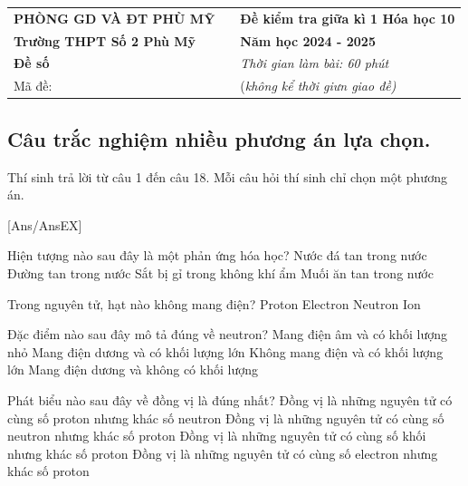 \begin{tcolorbox}[
	enhanced jigsaw,
	frame empty,
	colback=\mycolor!10,
	arc is angular,
	arc=3mm
	]
	{\renewcommand{\arraystretch}{0.9} \begin{tabular}{C{0.4\textwidth}p{0.2cm}C{0.6\textwidth}}
			{\textbf{PHÒNG GD VÀ ĐT PHÙ MỸ}} && {\textbf{Đề kiểm tra giữa kì 1 Hóa học 10}}\\
			{\textbf{Trường THPT Số 2 Phù Mỹ}} && {\textbf{Năm học 2024 - 2025}}\\
			{\textbf{Đề số \thesode}} && {\itshape Thời gian làm bài: 60 phút}\\
			Mã đề: \textbf{\made} & & (\itshape không kể thời giưn giao đề)
	\end{tabular}}
\end{tcolorbox}
\subsection{Câu trắc nghiệm nhiều phương án lựa chọn.} Thí sinh trả lời từ câu 1 đến câu 18. Mỗi câu hỏi thí sinh chỉ chọn một phương án.

[Ans/AnsEX]
\setcounter{ex}{0}
	\begin{ex}
		Hiện tượng nào sau đây là một phản ứng hóa học?
		\choice
		{Nước đá tan trong nước}
		{Đường tan trong nước}
		{Sắt bị gỉ trong không khí ẩm}
		{Muối ăn tan trong nước}
		\loigiai{}
	\end{ex}
	
	\begin{ex}
		Trong nguyên tử, hạt nào không mang điện?
		\choice
		{Proton}
		{Electron}
		{Neutron}
		{Ion}
		\loigiai{}
	\end{ex}
	
	\begin{ex}
		Đặc điểm nào sau đây mô tả đúng về neutron?
		\choice
		{Mang điện âm và có khối lượng nhỏ}
		{Mang điện dương và có khối lượng lớn}
		{Không mang điện và có khối lượng lớn}
		{Mang điện dương và không có khối lượng}
		\loigiai{}
	\end{ex}
	
	\begin{ex}
		Phát biểu nào sau đây về đồng vị là đúng nhất?
		\choice
		{Đồng vị là những nguyên tử có cùng số proton nhưng khác số neutron}
		{Đồng vị là những nguyên tử có cùng số neutron nhưng khác số proton}
		{Đồng vị là những nguyên tử có cùng số khối nhưng khác số proton}
		{Đồng vị là những nguyên tử có cùng số electron nhưng khác số proton}
		\loigiai{}
	\end{ex}
	
